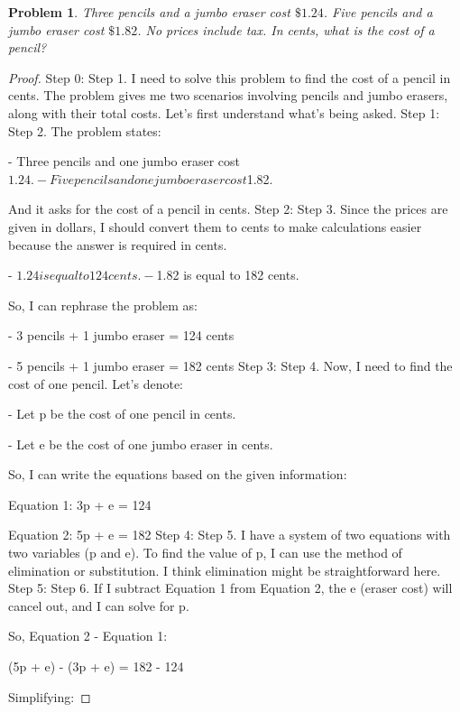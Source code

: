 \documentclass{article}
\newtheorem{theorem}{Problem}
\begin{document}
\begin{theorem}
Three pencils and a jumbo eraser cost $\$1.24$. Five pencils and a jumbo eraser cost $\$1.82$. No prices include tax. In cents, what is the cost of a pencil?
\end{theorem}

\begin{proof}
Step 0: Step 1. I need to solve this problem to find the cost of a pencil in cents. The problem gives me two scenarios involving pencils and jumbo erasers, along with their total costs. Let's first understand what's being asked.
Step 1: Step 2. The problem states:

        - Three pencils and one jumbo eraser cost $1.24.

        - Five pencils and one jumbo eraser cost $1.82.

        And it asks for the cost of a pencil in cents.
Step 2: Step 3. Since the prices are given in dollars, I should convert them to cents to make calculations easier because the answer is required in cents.

        - $1.24 is equal to 124 cents.

        - $1.82 is equal to 182 cents.

        So, I can rephrase the problem as:

        - 3 pencils + 1 jumbo eraser = 124 cents

        - 5 pencils + 1 jumbo eraser = 182 cents
Step 3: Step 4. Now, I need to find the cost of one pencil. Let's denote:

        - Let p be the cost of one pencil in cents.

        - Let e be the cost of one jumbo eraser in cents.

        So, I can write the equations based on the given information:

        Equation 1: 3p + e = 124

        Equation 2: 5p + e = 182
Step 4: Step 5. I have a system of two equations with two variables (p and e). To find the value of p, I can use the method of elimination or substitution. I think elimination might be straightforward here.
Step 5: Step 6. If I subtract Equation 1 from Equation 2, the e (eraser cost) will cancel out, and I can solve for p.

        So, Equation 2 - Equation 1:

        (5p + e) - (3p + e) = 182 - 124

        Simplifying:


\end{proof}
\end{document}
